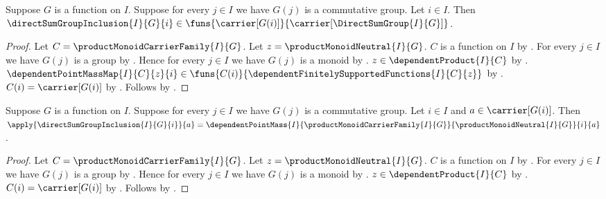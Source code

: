 \begin{proposition}\label{direct_sum_group_inclusion_type}
    Suppose $G$ is a function on $I$.
    Suppose for every $j\in I$ we have $G(j)$ is a commutative group.
    Let $i\in I$.
    Then
        $\directSumGroupInclusion{I}{G}{i}\in
            \funs{\carrier[G(i)]}{
                \carrier[\DirectSumGroup{I}{G}]}$.
\end{proposition}
\begin{proof}
    Let $C=\productMonoidCarrierFamily{I}{G}$.
    Let $z=\productMonoidNeutral{I}{G}$.
    $C$ is a function on $I$ by
        .
    For every $j\in I$ we have $G(j)$ is a group by
        .
    Hence for every $j\in I$ we have $G(j)$ is a monoid by
        .
    $z\in\dependentProduct{I}{C}$ by
        .
    $\dependentPointMassMap{I}{C}{z}{i}\in
        \funs{C(i)}{
            \dependentFinitelySupportedFunctions{I}{C}{z}}$ by
        .
    $C(i)=\carrier[G(i)]$ by
        .
    Follows by
        .
\end{proof}

\begin{proposition}\label{direct_sum_group_inclusion_apply}
    Suppose $G$ is a function on $I$.
    Suppose for every $j\in I$ we have $G(j)$ is a commutative group.
    Let $i\in I$ and $a\in\carrier[G(i)]$.
    Then
        $\apply{\directSumGroupInclusion{I}{G}{i}}{a}
            =\dependentPointMass
                {I}{\productMonoidCarrierFamily{I}{G}}{
                    \productMonoidNeutral{I}{G}}{i}{a}$.
\end{proposition}
\begin{proof}
    Let $C=\productMonoidCarrierFamily{I}{G}$.
    Let $z=\productMonoidNeutral{I}{G}$.
    $C$ is a function on $I$ by
        .
    For every $j\in I$ we have $G(j)$ is a group by
        .
    Hence for every $j\in I$ we have $G(j)$ is a monoid by
        .
    $z\in\dependentProduct{I}{C}$ by
        .
    $C(i)=\carrier[G(i)]$ by
        .
    Follows by
        .
\end{proof}

